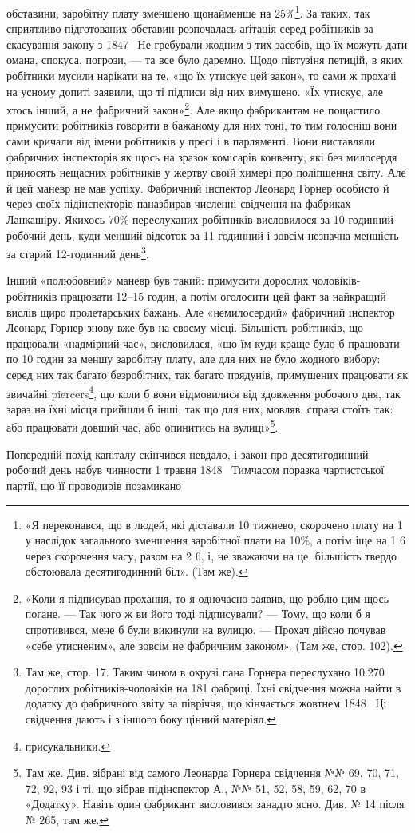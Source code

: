 \parcont{}  %
обставини, заробітну плату зменшено щонайменше на 25\%\footnote{
«Я переконався, що в людей, які діставали 10 тижнево,
скорочено плату на 1 у наслідок загального зменшення заробітної
плати на 10\%, а потім іще на 1 6 через скорочення часу,
разом на 2 6, і, не зважаючи на це, більшість твердо обстоювала
десятигодинний біл». (Там же).
}.
За таких, так сприятливо підготованих обставин розпочалась
аґітація серед робітників за скасування закону з 1847~ Не гребували
жодним з тих засобів, що їх можуть дати омана, спокуса,
погрози, — та все було даремно. Щодо півтузіня петицій, в яких
робітники мусили нарікати на те, «що їх утискує цей закон», то
сами ж прохачі на усному допиті заявили, що ті підписи від них
вимушено. «Їх утискує, але хтось інший, а не фабричний закон»\footnote{
«Коли я підписував прохання, то я одночасно заявив, що роблю
цим щось погане. — Так чого ж ви його тоді підписували? — Тому, що коли б
я спротивився, мене б були викинули на вулицю. — Прохач дійсно почував
«себе утисненим», але зовсім не фабричним законом». (Там же, стор. 102).
}.
Але якщо фабрикантам не пощастило примусити робітників
говорити в бажаному для них тоні, то тим голосніш вони сами
кричали від імени робітників у пресі і в парляменті. Вони виставляли
фабричних інспекторів як щось на зразок комісарів конвенту,
які без милосердя приносять нещасних робітників у жертву
своїй химері про поліпшення світу. Але й цей маневр не мав
успіху. Фабричний інспектор Леонард Горнер особисто й через
своїх підінспекторів паназбирав численні свідчення на фабриках
Ланкашіру. Якихось 70\% переслуханих робітників висловилося
за 10-годинний робочий день, куди менший відсоток за 11-годинний
і зовсім незначна меншість за старий 12-годинний день\footnote{
Там же, стор. 17. Таким чином в окрузі пана Горнера переслухано
\num{10.270} дорослих робітників-чоловіків на 181 фабриці. Їхні свідчення
можна найти в додатку до фабричного звіту за півріччя, що кінчається
жовтнем 1848~ Ці свідчення дають і з іншого боку цінний матеріял.
}.

Інший «полюбовний» маневр був такий: примусити дорослих
чоловіків-робітників працювати 12--15 годин, а потім оголосити
цей факт за найкращий вислів щиро пролетарських бажань.
Але «немилосердий» фабричний інспектор Леонард Горнер знову
вже був на своєму місці. Більшість робітників, що працювали
«надмірний час», висловилася, «що їм куди краще було б працювати
по 10 годин за меншу заробітну плату, але для них не було
жодного вибору: серед них так багато безробітних, так багато
прядунів, примушених працювати як звичайні piercers\footnote*{
присукальники. 
}, що
коли б вони відмовилися від здовження робочого дня, так зараз
на їхні місця прийшли б інші, так що для них, мовляв, справа
стоїть так: або працювати довший час, або опинитись на вулиці»\footnote{
Там же. Див. зібрані від самого Леонарда Горнера свідчення
№№ 69, 70, 71, 72, 92, 93 і ті, що зібрав підінспектор А., №№ 51, 52,
58, 59, 62, 70 в «Додатку». Навіть один фабрикант висловився занадто
ясно. Див. № 14 після № 265, там же.
}.

Попередній похід капіталу скінчився невдало, і закон про десятигодинний
робочий день набув чинности 1 травня 1848~ Тимчасом
поразка чартистської партії, що її проводирів позамикано
\parbreak{}  %
